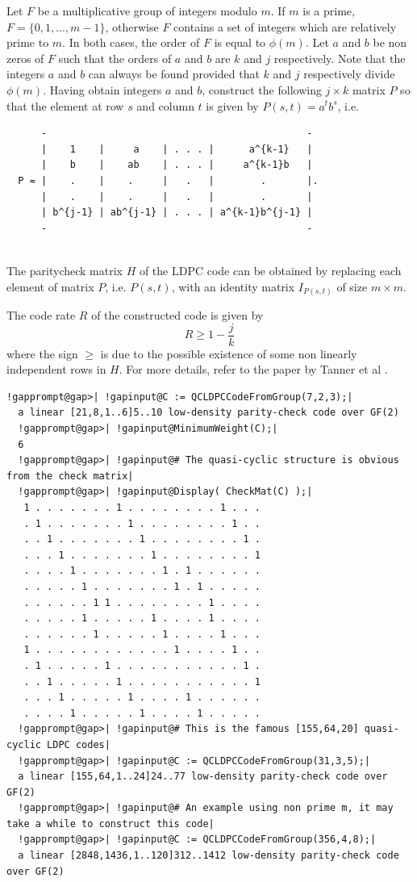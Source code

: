 \documentclass[a4paper,11pt]{report}
\begin{document}
{{{ Let $F$ be a multiplicative group of integers modulo $m$. If $m$ is a prime, $F=\{0,1,...,m-1\}$, otherwise $F$ contains a set of integers which are relatively prime to $m$. In both cases, the order of $F$ is equal to $\phi(m)$. Let $a$ and $b$ be non zeros of $F$ such that the orders of $a$ and $b$ are $k$ and $j$ respectively. Note that the integers $a$ and $b$ can always be found provided that $k$ and $j$ respectively divide $\phi(m)$. Having obtain integers $a$ and $b$, construct the following $j \times k$ matrix $P$ so that the element at row $s$ and column $t$ is given by $P(s,t) = a^tb^s$, i.e. 
\begin{verbatim}  
      -                                             -
      |    1    |     a    | . . . |      a^{k-1}   |
      |    b    |    ab    | . . . |     a^{k-1}b   |
  P = |    .    |    .     |   .   |        .       |.
      |    .    |    .     |   .   |        .       |
      | b^{j-1} | ab^{j-1} | . . . | a^{k-1}b^{j-1} |
      -                                             -
  		
\end{verbatim}
 The parity\texttt{}check matrix $H$ of the LDPC code can be obtained by replacing each element of matrix $P$, i.e. $P(s,t)$, with an identity matrix $I_{P(s,t)}$ of size $m \times m$. 

 The code rate $R$ of the constructed code is given by 
\[ R \geq 1 - \frac{j}{k} \]
 where the sign $\geq$ is due to the possible existence of some non linearly independent rows in $H$. For more details, refer to the paper by Tanner et al \cite{TSSFC04}. }

 
\begin{Verbatim}[commandchars=!@|,fontsize=\small,frame=single,label=Example]
  !gapprompt@gap>| !gapinput@C := QCLDPCCodeFromGroup(7,2,3);|
  a linear [21,8,1..6]5..10 low-density parity-check code over GF(2)
  !gapprompt@gap>| !gapinput@MinimumWeight(C);|
  6
  !gapprompt@gap>| !gapinput@# The quasi-cyclic structure is obvious from the check matrix|
  !gapprompt@gap>| !gapinput@Display( CheckMat(C) );|
   1 . . . . . . . 1 . . . . . . . . 1 . . .
   . 1 . . . . . . . 1 . . . . . . . . 1 . .
   . . 1 . . . . . . . 1 . . . . . . . . 1 .
   . . . 1 . . . . . . . 1 . . . . . . . . 1
   . . . . 1 . . . . . . . 1 . 1 . . . . . .
   . . . . . 1 . . . . . . . 1 . 1 . . . . .
   . . . . . . 1 1 . . . . . . . . 1 . . . .
   . . . . . 1 . . . . . 1 . . . . 1 . . . .
   . . . . . . 1 . . . . . 1 . . . . 1 . . .
   1 . . . . . . . . . . . . 1 . . . . 1 . .
   . 1 . . . . . 1 . . . . . . . . . . . 1 .
   . . 1 . . . . . 1 . . . . . . . . . . . 1
   . . . 1 . . . . . 1 . . . . 1 . . . . . .
   . . . . 1 . . . . . 1 . . . . 1 . . . . .
  !gapprompt@gap>| !gapinput@# This is the famous [155,64,20] quasi-cyclic LDPC codes|
  !gapprompt@gap>| !gapinput@C := QCLDPCCodeFromGroup(31,3,5);|
  a linear [155,64,1..24]24..77 low-density parity-check code over GF(2)
  !gapprompt@gap>| !gapinput@# An example using non prime m, it may take a while to construct this code|
  !gapprompt@gap>| !gapinput@C := QCLDPCCodeFromGroup(356,4,8);|
  a linear [2848,1436,1..120]312..1412 low-density parity-check code over GF(2)
\end{Verbatim}
  }

 }
\end{document}
